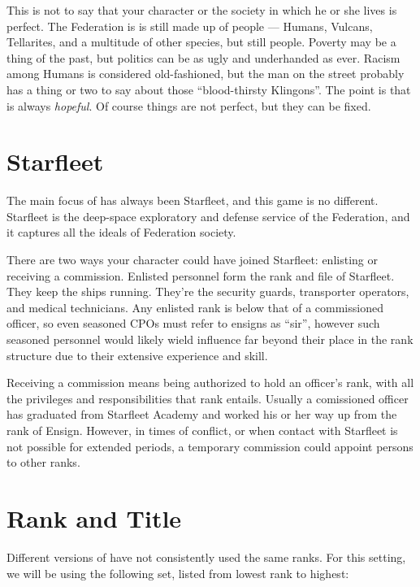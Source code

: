 \documentclass[12pt,titlepage,openany]{book}
\begin{document}
This is not to say that your character or the society in which he or she lives
is perfect. The Federation is is still made up of people --- Humans, Vulcans,
Tellarites, and a multitude of other species, but still people. Poverty may be
a thing of the past, but politics can be as ugly and underhanded as ever.
Racism among Humans is considered old-fashioned, but the man on the street
probably has a thing or two to say about those ``blood-thirsty Klingons''. The
point is that \StarTrek{} is always \emph{hopeful}. Of course things are not
perfect, but they can be fixed.

\section{Starfleet}\label{sec:starfleet}
The main focus of \StarTrek{} has always been Starfleet, and this game is no
different. Starfleet is the deep-space exploratory and defense service of the
Federation, and it captures all the ideals of Federation society.

There are two ways your character could have joined Starfleet: enlisting or
receiving a commission. Enlisted personnel form the rank and file of Starfleet.
They keep the ships running. They're the security guards, transporter operators,
and medical technicians. Any enlisted rank is below that of a commissioned
officer, so even seasoned CPOs must refer to ensigns as ``sir'', however such
seasoned personnel would likely wield influence far beyond their place in the
rank structure due to their extensive experience and skill.

Receiving a commission means being authorized to hold an officer's rank, with
all the privileges and responsibilities that rank entails. Usually a
comissioned officer has graduated from Starfleet Academy and worked his or her
way up from the rank of Ensign. However, in times of conflict, or when contact
with Starfleet is not possible for extended periods, a temporary commission
could appoint persons to other ranks.

\section{Rank and Title}\label{sec:rank-and-title}
Different versions of \StarTrek{} have not consistently used the same ranks.
For this setting, we will be using the following set, listed from lowest rank
to highest:
\end{document}
